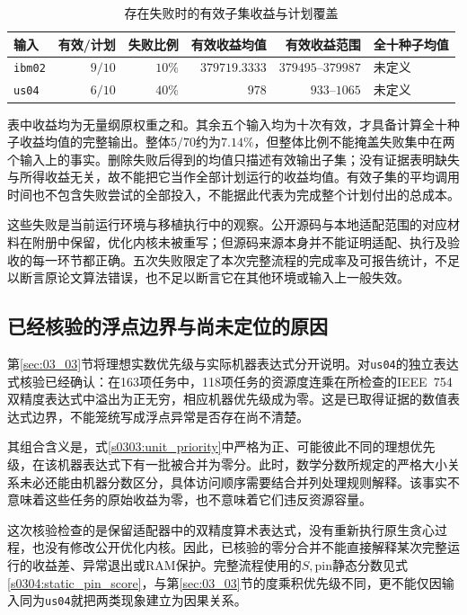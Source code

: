 \begin{table}[tbp]
 \centering
 \small
 \caption{存在失败时的有效子集收益与计划覆盖}
 \label{s0308:conditional_statistics}
 \begin{tabular}{@{}lrrrrl@{}}
  \toprule
  输入 & 有效/计划 & 失败比例 & 有效收益均值 & 有效收益范围 & 全十种子均值\\
  \midrule
  \texttt{ibm02} & $9/10$ & $10\%$ & $379719.3333$ & $379495$--$379987$ & 未定义\\
  \texttt{us04} & $6/10$ & $40\%$ & $978$ & $933$--$1065$ & 未定义\\
  \bottomrule
 \end{tabular}
\end{table}

表中收益均为无量纲原权重之和。其余五个输入均为十次有效，才具备计算全十种子收益均值的完整输出。整体$5/70$约为$7.14\%$，但整体比例不能掩盖失败集中在两个输入上的事实。删除失败后得到的均值只描述有效输出子集；没有证据表明缺失与所得收益无关，故不能把它当作全部计划运行的收益均值。有效子集的平均调用时间也不包含失败尝试的全部投入，不能据此代表为完成整个计划付出的总成本。

这些失败是当前运行环境与移植执行中的观察。公开源码与本地适配范围的对应材料在附册中保留，优化内核未被重写；但源码来源本身并不能证明适配、执行及验收的每一环节都正确。五次失败限定了本次完整流程的完成率及可报告统计，不足以断言原论文算法错误，也不足以断言它在其他环境或输入上一般失效。

\subsection{已经核验的浮点边界与尚未定位的原因}

第\ref{sec:03_03}节将理想实数优先级与实际机器表达式分开说明。对\texttt{us04}的独立表达式核验已经确认：在163项任务中，118项任务的资源度连乘在所检查的IEEE~754双精度表达式中溢出为正无穷，相应机器优先级成为零。这是已取得证据的数值表达式边界，不能笼统写成浮点异常是否存在尚不清楚。

其组合含义是，式\eqref{s0303:unit_priority}中严格为正、可能彼此不同的理想优先级，在该机器表达式下有一批被合并为零分。此时，数学分数所规定的严格大小关系未必还能由机器分数区分，具体访问顺序需要结合并列处理规则解释。该事实不意味着这些任务的原始收益为零，也不意味着它们违反资源容量。

这次核验检查的是保留适配器中的双精度算术表达式，没有重新执行原生贪心过程，也没有修改公开优化内核。因此，已核验的零分合并不能直接解释某次完整运行的收益差、异常退出或RAM保护。完整流程使用的$S,\mathrm{pin}$静态分数见式\eqref{s0304:static_pin_score}，与第\ref{sec:03_03}节的度乘积优先级不同，更不能仅因输入同为\texttt{us04}就把两类现象建立为因果关系。

